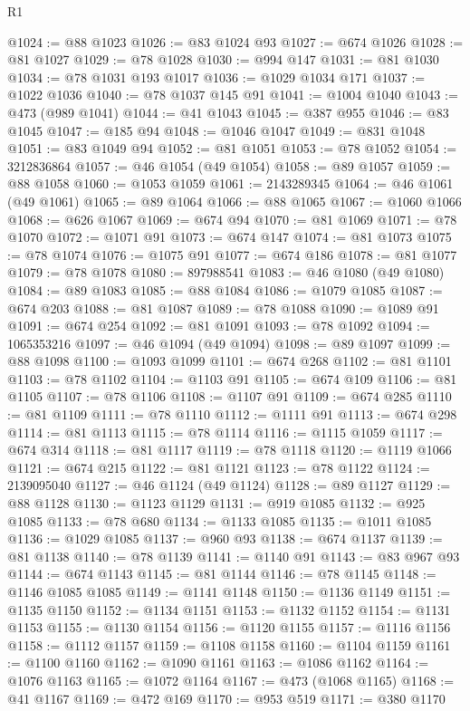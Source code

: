 \begin{lexlean}{R1}
\begin{coremodule}
@1024 := @88 @1023
@1026 := @83 @1024 @93
@1027 := @674 @1026
@1028 := @81 @1027
@1029 := @78 @1028
@1030 := @994 @147
@1031 := @81 @1030
@1034 := @78 @1031 @193 @1017
@1036 := @1029 @1034 @171
@1037 := @1022 @1036
@1040 := @78 @1037 @145 @91
@1041 := @1004 @1040
@1043 := @473 (@989 @1041)
@1044 := @41 @1043
@1045 := @387 @955
@1046 := @83 @1045
@1047 := @185 @94
@1048 := @1046 @1047
@1049 := @831 @1048
@1051 := @83 @1049 @94
@1052 := @81 @1051
@1053 := @78 @1052
@1054 := 3212836864
@1057 := @46 @1054 (@49 @1054)
@1058 := @89 @1057
@1059 := @88 @1058
@1060 := @1053 @1059
@1061 := 2143289345
@1064 := @46 @1061 (@49 @1061)
@1065 := @89 @1064
@1066 := @88 @1065
@1067 := @1060 @1066
@1068 := @626 @1067
@1069 := @674 @94
@1070 := @81 @1069
@1071 := @78 @1070
@1072 := @1071 @91
@1073 := @674 @147
@1074 := @81 @1073
@1075 := @78 @1074
@1076 := @1075 @91
@1077 := @674 @186
@1078 := @81 @1077
@1079 := @78 @1078
@1080 := 897988541
@1083 := @46 @1080 (@49 @1080)
@1084 := @89 @1083
@1085 := @88 @1084
@1086 := @1079 @1085
@1087 := @674 @203
@1088 := @81 @1087
@1089 := @78 @1088
@1090 := @1089 @91
@1091 := @674 @254
@1092 := @81 @1091
@1093 := @78 @1092
@1094 := 1065353216
@1097 := @46 @1094 (@49 @1094)
@1098 := @89 @1097
@1099 := @88 @1098
@1100 := @1093 @1099
@1101 := @674 @268
@1102 := @81 @1101
@1103 := @78 @1102
@1104 := @1103 @91
@1105 := @674 @109
@1106 := @81 @1105
@1107 := @78 @1106
@1108 := @1107 @91
@1109 := @674 @285
@1110 := @81 @1109
@1111 := @78 @1110
@1112 := @1111 @91
@1113 := @674 @298
@1114 := @81 @1113
@1115 := @78 @1114
@1116 := @1115 @1059
@1117 := @674 @314
@1118 := @81 @1117
@1119 := @78 @1118
@1120 := @1119 @1066
@1121 := @674 @215
@1122 := @81 @1121
@1123 := @78 @1122
@1124 := 2139095040
@1127 := @46 @1124 (@49 @1124)
@1128 := @89 @1127
@1129 := @88 @1128
@1130 := @1123 @1129
@1131 := @919 @1085
@1132 := @925 @1085
@1133 := @78 @680
@1134 := @1133 @1085
@1135 := @1011 @1085
@1136 := @1029 @1085
@1137 := @960 @93
@1138 := @674 @1137
@1139 := @81 @1138
@1140 := @78 @1139
@1141 := @1140 @91
@1143 := @83 @967 @93
@1144 := @674 @1143
@1145 := @81 @1144
@1146 := @78 @1145
@1148 := @1146 @1085 @1085
@1149 := @1141 @1148
@1150 := @1136 @1149
@1151 := @1135 @1150
@1152 := @1134 @1151
@1153 := @1132 @1152
@1154 := @1131 @1153
@1155 := @1130 @1154
@1156 := @1120 @1155
@1157 := @1116 @1156
@1158 := @1112 @1157
@1159 := @1108 @1158
@1160 := @1104 @1159
@1161 := @1100 @1160
@1162 := @1090 @1161
@1163 := @1086 @1162
@1164 := @1076 @1163
@1165 := @1072 @1164
@1167 := @473 (@1068 @1165)
@1168 := @41 @1167
@1169 := @472 @169
@1170 := @953 @519
@1171 := @380 @1170

\end{coremodule}
\end{lexlean}
